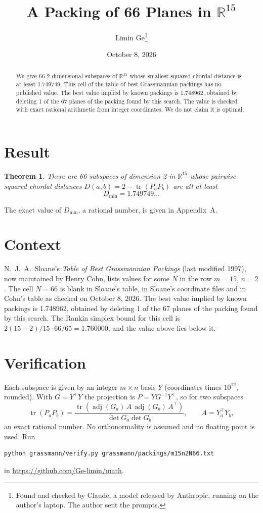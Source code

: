 \documentclass[11pt,a4paper]{article}
\title{A Packing of 66 Planes in $\mathbb{R}^{15}$}
\author{Limin Ge\thanks{Found and checked by Claude, a model released by Anthropic, running on the author's laptop. The author sent the prompts.}}
\date{October 8, 2026}
\newtheorem*{theorem}{Theorem}
\begin{document}
\maketitle
\begin{abstract}
We give 66 2-dimensional subspaces of $\mathbb{R}^{15}$ whose smallest squared chordal distance is at least 1.749749. This cell of the table of best Grassmannian packings has no published value. The best value implied by known packings is 1.748962, obtained by deleting 1 of the 67 planes of the packing found by this search. The value is checked with exact rational arithmetic from integer coordinates. We do not claim it is optimal.
\end{abstract}

\section{Result}
\begin{theorem}
There are 66 subspaces of dimension 2 in $\mathbb{R}^{15}$ whose pairwise squared chordal distances $D(a,b) = 2 - \operatorname{tr}(P_aP_b)$ are all at least
\[ D_{\min} = 1.749749\ldots \]
\end{theorem}
The exact value of $D_{\min}$, a rational number, is given in Appendix~A.


\section{Context}
N.~J.~A.~Sloane's \emph{Table of Best Grassmannian Packings} (last modified 1997), now maintained by Henry Cohn, lists values for some $N$ in the row $m=15$, $n=2$. The cell $N=66$ is blank in Sloane's table, in Sloane's coordinate files and in Cohn's table as checked on October 8, 2026. The best value implied by known packings is 1.748962, obtained by deleting 1 of the 67 planes of the packing found by this search. The Rankin simplex bound for this cell is $2(15-2)/15\cdot 66/65 = 1.760000$, and the value above lies below it.


\section{Verification}
Each subspace is given by an integer $m\times n$ basis $Y$ (coordinates times $10^{12}$, rounded). With $G=Y^\top Y$ the projection is $P=YG^{-1}Y^\top$, so for two subspaces
\[ \operatorname{tr}(P_aP_b)=\frac{\operatorname{tr}(\operatorname{adj}(G_a)\,A\,\operatorname{adj}(G_b)\,A^\top)}{\det G_a\det G_b},\qquad A=Y_a^\top Y_b, \]
an exact rational number. No orthonormality is assumed and no floating point is used. Run
\begin{verbatim}
python grassmann/verify.py grassmann/packings/m15n2N66.txt
\end{verbatim}
in \url{https://github.com/Ge-limin/math}.
\end{document}
